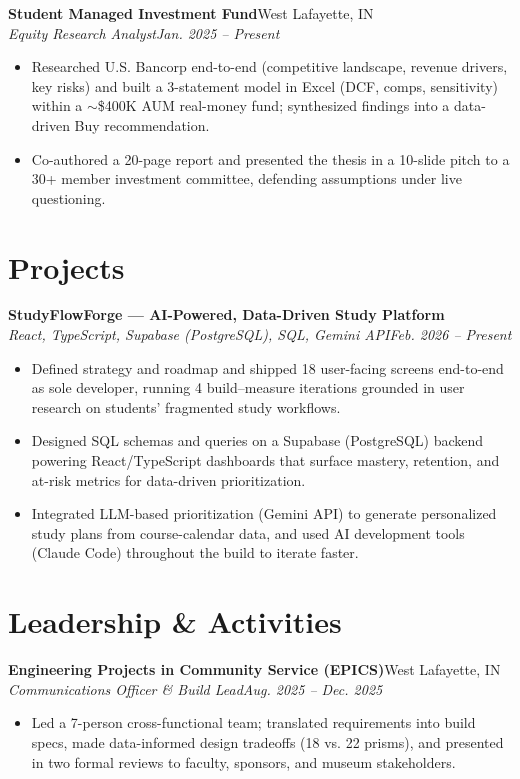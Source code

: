 \documentclass[10pt,letterpaper]{article}
\newcommand{\entry}[4]{%
  \textbf{#1}\hfill #2\\[1pt]
  \textit{#3}\hfill \textit{#4}\\[2pt]
}
\begin{document}
\entry{Student Managed Investment Fund}{West Lafayette, IN}{Equity Research Analyst}{Jan. 2025 -- Present}
\begin{itemize}
  \item Researched U.S. Bancorp end-to-end (competitive landscape, revenue drivers, key risks) and built a 3-statement model in Excel (DCF, comps, sensitivity) within a $\sim$\$400K AUM real-money fund; synthesized findings into a data-driven Buy recommendation.
  \item Co-authored a 20-page report and presented the thesis in a 10-slide pitch to a 30+ member investment committee, defending assumptions under live questioning.
\end{itemize}

\section*{Projects}
\entry{StudyFlowForge --- AI-Powered, Data-Driven Study Platform}{}{React, TypeScript, Supabase (PostgreSQL), SQL, Gemini API}{Feb. 2026 -- Present}
\begin{itemize}
  \item Defined strategy and roadmap and shipped 18 user-facing screens end-to-end as sole developer, running 4 build--measure iterations grounded in user research on students' fragmented study workflows.
  \item Designed SQL schemas and queries on a Supabase (PostgreSQL) backend powering React/TypeScript dashboards that surface mastery, retention, and at-risk metrics for data-driven prioritization.
  \item Integrated LLM-based prioritization (Gemini API) to generate personalized study plans from course-calendar data, and used AI development tools (Claude Code) throughout the build to iterate faster.
\end{itemize}

\section*{Leadership \& Activities}
\entry{Engineering Projects in Community Service (EPICS)}{West Lafayette, IN}{Communications Officer \& Build Lead}{Aug. 2025 -- Dec. 2025}
\begin{itemize}
  \item Led a 7-person cross-functional team; translated requirements into build specs, made data-informed design tradeoffs (18 vs. 22 prisms), and presented in two formal reviews to faculty, sponsors, and museum stakeholders.
\end{itemize}
\end{document}
